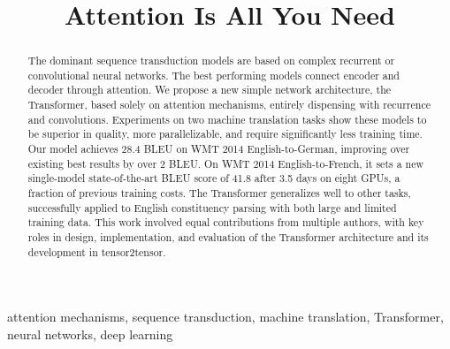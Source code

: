 \documentclass[conference]{IEEEtran}
\begin{document}
\title{Attention Is All You Need}

\author{
}

\maketitle

\begin{abstract}
The dominant sequence transduction models are based on complex recurrent or convolutional neural networks. The best performing models connect encoder and decoder through attention. We propose a new simple network architecture, the Transformer, based solely on attention mechanisms, entirely dispensing with recurrence and convolutions. Experiments on two machine translation tasks show these models to be superior in quality, more parallelizable, and require significantly less training time. Our model achieves 28.4 BLEU on WMT 2014 English-to-German, improving over existing best results by over 2 BLEU. On WMT 2014 English-to-French, it sets a new single-model state-of-the-art BLEU score of 41.8 after 3.5 days on eight GPUs, a fraction of previous training costs. The Transformer generalizes well to other tasks, successfully applied to English constituency parsing with both large and limited training data. This work involved equal contributions from multiple authors, with key roles in design, implementation, and evaluation of the Transformer architecture and its development in tensor2tensor.
\end{abstract}

\begin{IEEEkeywords}
attention mechanisms, sequence transduction, machine translation, Transformer, neural networks, deep learning
\end{IEEEkeywords}
\end{document}
